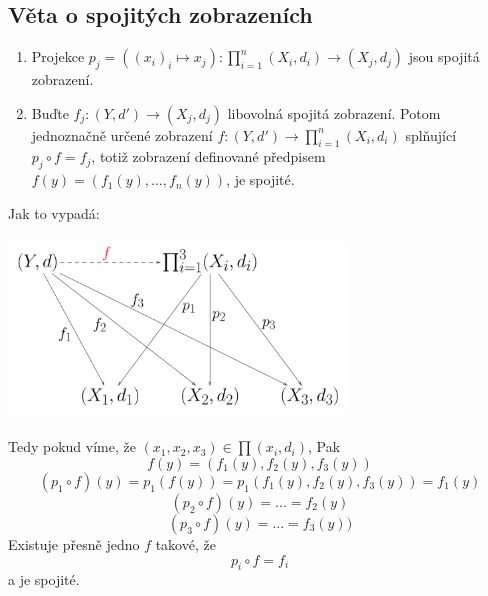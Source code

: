 \documentclass[../main.tex]{subfiles}
\begin{document}
\subsection{Věta o spojitých zobrazeních}
\begin{enumerate}
\item Projekce $p_j = ((x_i)_i \mapsto x_j) : \prod^n_{i=1}(X_i,d_i) \rightarrow (X_j,d_j)$ jsou spojitá zobrazení.

\item Buďte $f_j:(Y,d') \rightarrow (X_j,d_j)$ libovolná spojitá zobrazení. Potom jednoznačně určené zobrazení 
$f:(Y,d') \rightarrow \prod^n_{i=1}(X_i,d_i)$ splňující $p_j \circ f = f_j$, totiž zobrazení definované předpisem
$f(y) = (f_1(y),...,f_n(y))$, je spojité.
\end{enumerate}
Jak to vypadá:
\begin{center}
\includegraphics[width=9cm,height=4.8cm]{ipkm.png}
\end{center}

Tedy pokud víme, že $(x_1,x_2,x_3)\in \prod (x_i,d_i)$, Pak
\[f(y) = (f_1(y),f_2(y),f_3(y))\]
\[(p_1\circ f)(y) = p_1(f(y)) = p_1(f_1(y),f_2(y),f_3(y))=f_1(y)\]
\[(p_2\circ f)(y) = ... = f_2(y)\]
\[(p_3\circ f)(y) = ... = f_3(y))\]
Existuje přesně jedno $f$ takové, že 
\[p_i \circ f = f_i\]
a je spojité.
\end{document}
